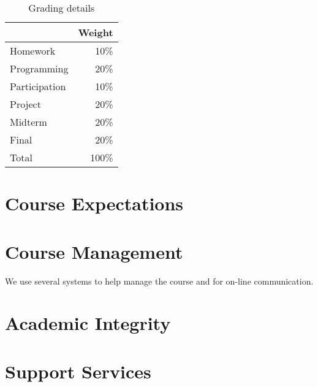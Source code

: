 \documentclass[11pt]{article}
\begin{document}
\begin{table}[htb]
  \centering
  \begin{tabular}{lr}
    \toprule
    & Weight \\
    \midrule
    Homework      & 10\%   \\
    Programming   & 20\%   \\
    Participation & 10\%   \\
    Project       & 20\%   \\
    Midterm       & 20\%   \\
    Final         & 20\%   \\
    \midrule
    Total         & 100\%  \\
    \bottomrule
  \end{tabular}
  \caption{Grading details}
  \label{tab:grading}
\end{table}
\begin{comment}
#+ORGTBL: SEND grades orgtbl-to-latex :splice nil :skip 0 :booktabs t
|               | Weight |
|               |    <r> |
|---------------+--------|
| Homework      |    10%
| Programming   |    20%
| Participation |    10%
| Project       |    20%
| Midterm       |    20%
| Final         |    20%
|---------------+--------|
| Total         |   100%
#+TBLFM: @11$2=100*vsum(@I..II);%
\end{comment}

\section{Course Expectations}



\section{Course Management}

We use several systems to help manage the course
and for on-line communication.





\section{Academic Integrity}



\section{Support Services}



\lastupdated

\end{document}
